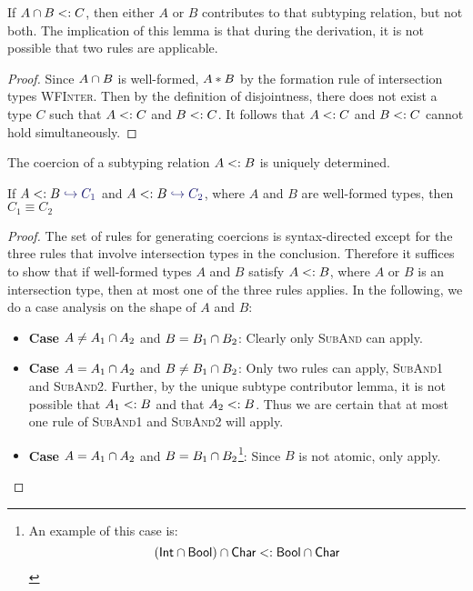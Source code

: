 \documentclass[nocopyrightspace,preprint,times,9pt]{sigplanconf}
\begin{document}
If $A \cap B <: C$, then either $A$ or $B$ contributes to that subtyping relation, but not both. The implication of this lemma is that during the derivation, it is not possible that two rules are applicable.

\newcommand{\wfinterlabel}{\textsc{WFInter}}

\begin{proof}
Since $A \cap B$ is well-formed, $A * B$ by the formation rule of intersection types \wfinterlabel. Then by the definition of disjointness, there does not exist a type $C$ such that $A <: C$ and $B <: C$. It follows that $A <: C$ and $B <: C$ cannot hold simultaneously.
\end{proof}

The coercion of a subtyping relation $A <: B$ is uniquely determined.

\begin{lemma} \label{unique-coercion}
If $A \subtype B \yields {C_1}$ and $A \subtype B \yields {C_2}$, where $A$ and $B$ are well-formed types, then $C_1 \equiv C_2$
\end{lemma}

\begin{proof}
The set of rules for generating coercions is syntax-directed except for the three rules that involve intersection types in the conclusion. Therefore it suffices to show that if well-formed types $A$ and $B$ satisfy $A <: B$, where $A$ or $B$ is an intersection type, then at most one of the three rules applies. In the following, we do a case analysis on the shape of $A$ and $B$:

\begin{itemize}
  \item \textbf{Case} $A \neq A_1 \cap A_2$ and $B = B_1 \cap B_2$: Clearly only \textsc{SubAnd} can apply.
  \item \textbf{Case} $A = A_1 \cap A_2$ and $B \neq B_1 \cap B_2$: Only two rules can apply, \textsc{SubAnd1} and \textsc{SubAnd2}. Further, by the unique subtype contributor lemma, it is not possible that $A_1 <: B$ and that $A_2 <: B$. Thus we are certain that at most one rule of \textsc{SubAnd1} and \textsc{SubAnd2} will apply.
  \item \textbf{Case} $A = A_1 \cap A_2$ and $B = B_1 \cap B_2$\footnote{An example of this case is:
    \[ (\textsf{Int} \cap \textsf{Bool}) \cap \textsf{Char} <: \textsf{Bool} \cap \textsf{Char} \]}: Since $B$ is not atomic, only  apply.

\end{itemize}
\end{proof}
\end{document}
